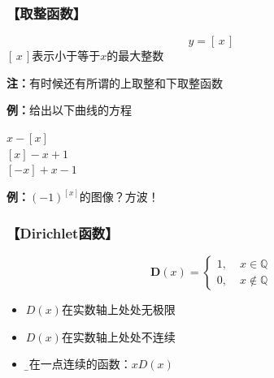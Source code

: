  \subsubsection{\bf 【取整函数】}

  $$y=\left[ \,x\, \right]$$
  $[\,x\,]$表示小于等于$x$的最大整数

	
{\bf 注：}有时候还有所谓的上取整和下取整函数

{{\bf 例：}给出以下曲线的方程}

\begin{center}
	\quad $x-[x]$\\

	\quad $[x]-x+1$\\

	\quad $[-x]+x-1$
\end{center}
	
{\bf 例：}$(-1)^{[x]}$的图像？方波！

\subsubsection{\bf 【Dirichlet函数】}
  $$\bm{D}(x) =\left\{
  \begin{array}{ll}
  	1,\;& x\in\mathbb{Q} \\
  	0,\;& x\notin\mathbb{Q}
  \end{array}
  \right.$$
  \begin{itemize}
    \item $D(x)$在实数轴上处处无极限
	\item $D(x)$在实数轴上处处不连续
	\item {\b 仅在一点连续的函数：}$xD(x)$
  \end{itemize}

